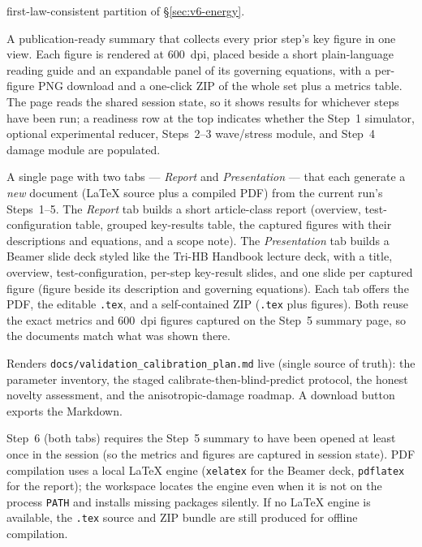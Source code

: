 \documentclass[11pt,a4paper,openany]{book}
\providecommand{\SI}[2]{\qty{#1}{#2}}
\theoremstyle{handbook}
\begin{document}
\begin{description}[leftmargin=2em,style=nextline]
    first-law-consistent partition of \S\ref{sec:v6-energy}.
  \item[Step 5: Summary of Results]
    A publication-ready summary that collects every prior step's key figure
    in one view. Each figure is rendered at \SI{600}{dpi}, placed beside a
    short plain-language reading guide and an expandable panel of its
    governing equations, with a per-figure PNG download and a one-click ZIP
    of the whole set plus a metrics table. The page reads the shared session
    state, so it shows results for whichever steps have been run; a readiness
    row at the top indicates whether the Step~1 simulator, optional
    experimental reducer, Steps~2--3 wave/stress module, and Step~4 damage
    module are populated.
  \item[Step 6: Report and Presentation]
    A single page with two tabs --- \emph{Report} and \emph{Presentation} ---
    that each generate a \emph{new} document (LaTeX source plus a compiled
    PDF) from the current run's Steps~1--5. The \emph{Report} tab builds a
    short article-class report (overview, test-configuration table, grouped
    key-results table, the captured figures with their descriptions and
    equations, and a scope note). The \emph{Presentation} tab builds a Beamer
    slide deck styled like the Tri-HB Handbook lecture deck, with a title,
    overview, test-configuration, per-step key-result slides, and one slide
    per captured figure (figure beside its description and governing
    equations). Each tab offers the PDF, the editable \texttt{.tex}, and a
    self-contained ZIP (\texttt{.tex} plus figures). Both reuse the exact
    metrics and \SI{600}{dpi} figures captured on the Step~5 summary page, so
    the documents match what was shown there.
  \item[Validation \& publication plan]
    Renders \texttt{docs/validation\_calibration\_plan.md} live (single source
    of truth): the parameter inventory, the staged calibrate-then-blind-predict
    protocol, the honest novelty assessment, and the anisotropic-damage
    roadmap. A download button exports the Markdown.
\end{description}

\noindent Step~6 (both tabs) requires the Step~5 summary to have been
opened at least once in the session (so the metrics and figures are captured
in session state). PDF compilation uses a local \LaTeX{} engine
(\texttt{xelatex} for the Beamer deck, \texttt{pdflatex} for the report); the
workspace locates the engine even when it is not on the process \texttt{PATH}
and installs missing packages silently. If no \LaTeX{} engine is available,
the \texttt{.tex} source and ZIP bundle are still produced for offline
compilation.
\end{document}
